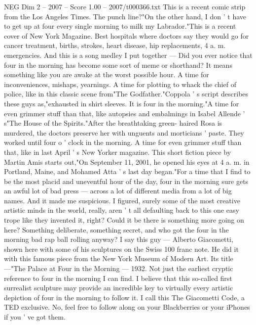 \begin{textsample}{NEG Dim 2 – 2007 – Score 1.00 – 2007/t000366.txt}  \label{ex:f2_neg_010}
This is a recent comic strip from the Los Angeles Times.
The punch line?"On the other hand, I don ' t have to get up at four every single morning to milk my Labrador."This is a recent cover of New York Magazine.
Best hospitals where doctors say they would go for cancer treatment, births, strokes, heart disease, hip replacements, 4 a. m. emergencies.
And this is a song medley I put together — Did you ever notice that four in the morning has become some sort of meme or shorthand?
It means something like you are awake at the worst possible hour.
A time for inconveniences, mishaps, yearnings.
A time for plotting to whack the chief of police, like in this classic scene from"The Godfather."Coppola ' s script describes these guys as,"exhausted in shirt sleeves.
It is four in the morning."A time for even grimmer stuff than that, like autopsies and embalmings in Isabel Allende ' s"The House of the Spirits."After the breathtaking green- haired Rosa is murdered, the doctors preserve her with unguents and morticians ' paste.
They worked until four o ' clock in the morning.
A time for even grimmer stuff than that, like in last April ' s New Yorker magazine.
This short fiction piece by Martin Amis starts out,"On September 11, 2001, he opened his eyes at 4 a. m. in Portland, Maine, and Mohamed Atta ' s last day began."For a time that I find to be the most placid and uneventful hour of the day, four in the morning sure gets an awful lot of bad press — across a lot of different media from a lot of big names.
And it made me suspicious.
I figured, surely some of the most creative artistic minds in the world, really, aren ' t all defaulting back to this one easy trope like they invented it, right?
Could it be there is something more going on here?
Something deliberate, something secret, and who got the four in the morning bad rap ball rolling anyway?
I say this guy — Alberto Giacometti, shown here with some of his sculptures on the Swiss 100 franc note.
He did it with this famous piece from the New York Museum of Modern Art.
Its title —"The Palace at Four in the Morning — 1932.
Not just the earliest cryptic reference to four in the morning I can find.
I believe that this so-called first surrealist sculpture may provide an incredible key to virtually every artistic depiction of four in the morning to follow it.
I call this The Giacometti Code, a TED exclusive.
No, feel free to follow along on your Blackberries or your iPhones if you ' ve got them.

\end{textsample}
